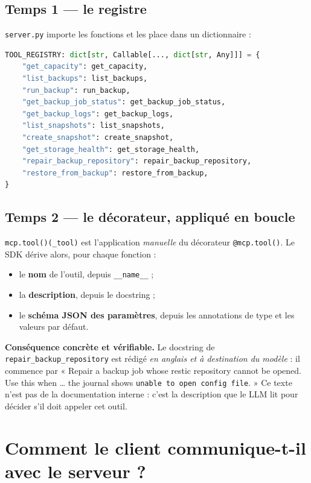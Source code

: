 \documentclass[11pt,a4paper]{report}
\newcommand{\file}[1]{\texttt{\small #1}}
\newcommand{\fn}[1]{\texttt{\small\textcolor{oasisviolet}{#1}}}
\begin{document}
\subsection*{Temps 1 --- le registre}
\file{server.py} importe les fonctions et les place dans un dictionnaire :

\begin{lstlisting}[language=Python,caption={app/mcp/storage/server.py}]
TOOL_REGISTRY: dict[str, Callable[..., dict[str, Any]]] = {
    "get_capacity": get_capacity,
    "list_backups": list_backups,
    "run_backup": run_backup,
    "get_backup_job_status": get_backup_job_status,
    "get_backup_logs": get_backup_logs,
    "list_snapshots": list_snapshots,
    "create_snapshot": create_snapshot,
    "get_storage_health": get_storage_health,
    "repair_backup_repository": repair_backup_repository,
    "restore_from_backup": restore_from_backup,
}
\end{lstlisting}

\subsection*{Temps 2 --- le décorateur, appliqué en boucle}
\texttt{mcp.tool()(\_tool)} est l'application \emph{manuelle} du décorateur
\fn{@mcp.tool()}. Le SDK dérive alors, pour chaque fonction :
\begin{itemize}
  \item le \textbf{nom} de l'outil, depuis \texttt{\_\_name\_\_} ;
  \item la \textbf{description}, depuis le docstring ;
  \item le \textbf{schéma JSON des paramètres}, depuis les annotations de type
  et les valeurs par défaut.
\end{itemize}

\begin{keybox}
\textbf{Conséquence concrète et vérifiable.} Le docstring de
\fn{repair\_backup\_repository} est rédigé \emph{en anglais et à destination du
modèle} : il commence par « Repair a backup job whose restic repository cannot
be opened. Use this when \ldots{} the journal shows \texttt{unable to open
config file}. » Ce texte n'est pas de la documentation interne : c'est la
description que le LLM lit pour décider s'il doit appeler cet outil.
\end{keybox}

\section{Comment le client communique-t-il avec le serveur ?}
\end{document}
